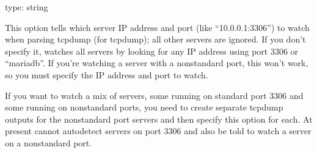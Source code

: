 \documentclass[letterpaper,10pt,english]{sphinxmanual}
\begin{document}
\begin{fulllineitems}
\label{\detokenize{mariadb-query-digest:cmdoption-mariadb-query-digest-watch-server}}
\sphinxAtStartPar
type: string

\sphinxAtStartPar
This option tells  which server IP address and port (like
“10.0.0.1:3306”) to watch when parsing tcpdump (for {\hyperref[\detokenize{mariadb-query-digest:cmdoption-mariadb-query-digest-type}]{}} tcpdump);
all other servers are ignored.  If you don’t specify it,
 watches all servers by looking for any IP address using port
3306 or “mariadb”.  If you’re watching a server with a non\sphinxhyphen{}standard port, this
won’t work, so you must specify the IP address and port to watch.

\sphinxAtStartPar
If you want to watch a mix of servers, some running on standard port 3306
and some running on non\sphinxhyphen{}standard ports, you need to create separate
tcpdump outputs for the non\sphinxhyphen{}standard port servers and then specify this
option for each.  At present  cannot auto\sphinxhyphen{}detect servers on
port 3306 and also be told to watch a server on a non\sphinxhyphen{}standard port.

\end{fulllineitems}
\end{document}
